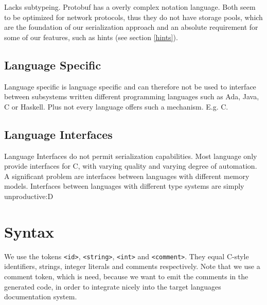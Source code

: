 \documentclass[a4paper,10pt]{article}
\begin{document}
Lacks subtypeing. Protobuf has a overly complex notation language. Both seem to be optimized for network protocols, thus they do not have storage pools, which are the foundation of our serialization approach and an absolute requirement for some of our features, such as hints (see section \ref{hints}).


\subsection*{Language Specific}

Language specific is language specific and can therefore not be used to interface between subsystems written different programming languages such as Ada, Java, C or Haskell. Plus not every language offers such a mechanism. E.g. C.


\subsection*{Language Interfaces}
Language Interfaces do not permit serialization capabilities. Most language only provide interfaces for C, with varying quality and varying degree of automation. A significant problem are interfaces between languages with different memory models.
Interfaces between languages with different type systems are simply unproductive:D


\section{Syntax}

We use the tokens \verb/<id>/, \verb/<string>/, \verb/<int>/ and \verb/<comment>/. They equal C-style identifiers, strings, integer literals and comments respectively. Note that we use a comment token, which is need, because we want to emit the comments in the generated code, in order to integrate nicely into the target languages documentation system.
\end{document}
